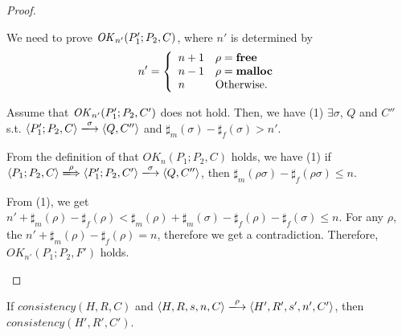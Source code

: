 \begin{proof}
\begin{itemize}
  We need to prove \(\mathit{OK}_{n'}(P_1';P_2, C) \), where \(n'\) is
  determined by 
  \[
   n'=\left\{
   \begin{array}{ll}
     n + 1 & \rho = \mathbf{free}\\
     n - 1 & \rho = \mathbf{malloc}\\
     n & \mbox{Otherwise.}
   \end{array}
   \right.
   \]

  Assume that \(\mathit{OK}_{n'}(P_1';P_2, C') \) does not hold. Then, we have
  (1) \( \exists \sigma \), \(Q\) and \(C''\) s.t. \( \langle
  P_1';P_2, C \rangle \xlongrightarrow{\sigma} \langle Q, C'' \rangle
  \) and \(\sharp_{m}(\sigma) - \sharp_{f}(\sigma) > n'\).

  From the definition of that \(OK_n(P_1;P_2, C)\) holds, we have (1)
  if \( \langle P_1;P_2, C \rangle \xLongrightarrow{\rho} \langle
  P_1';P_2, C' \rangle \xlongrightarrow{\sigma} \langle Q, C'' \rangle
  \), then \(\sharp_m(\rho\sigma) -
  \sharp_f(\rho\sigma) \le n \).

  From (1), we get \( n' + \sharp_m(\rho) - \sharp_f(\rho) <
  \sharp_m(\rho) + \sharp_m(\sigma) - \sharp_f(\rho) -
  \sharp_f(\sigma) \le n\). For any \(\rho\), the \( n' +
  \sharp_m(\rho) - \sharp_f(\rho) = n\), therefore we get a
  contradiction. Therefore, \(OK_{n'}(P_1;P_2, F')\) holds.

\end{itemize}
\end{proof}

\begin{lemma}
\label{lem:consistency}
If \(consistency(H, R, C)\) and \(\langle H, R, s, n, C \rangle
\xlongrightarrow{\rho} \langle H', R', s', n', C'\rangle \), then
\(consistency(H', R', C')\).
\end{lemma}

